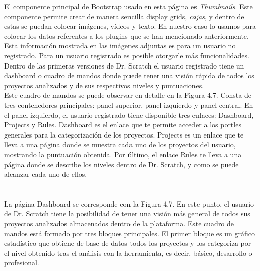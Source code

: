 \documentclass[a4paper, 12pt]{book}
\begin{document}
El componente principal de Bootstrap usado en esta página es \emph{Thumbnails}. Este
componente permite crear de manera sencilla display grids, \emph{cajas}, y dentro de
estas se puedan colocar imágenes, vídeos y texto. En nuestro caso lo usamos para
colocar los datos referentes a los plugins que se han mencionado anteriormente.  \\

Esta información mostrada en las imágenes adjuntas es para un usuario no registrado.
Para un usuario registrado es posible otorgarle más funcionalidades. Dentro de las
primeras versiones de Dr. Scratch el usuario registrado tiene un dashboard o cuadro
de mandos donde puede tener una visión rápida de todos los proyectos analizados y de
sus respectivos niveles y puntuaciones. \\

Este cuadro de mandos se puede observar en detalle en la Figura 4.7. Consta de tres 
contenedores principales: panel superior, panel izquierdo y panel central.
En el panel izquierdo, el usuario registrado tiene disponible tres enlaces: Dashboard,
Projects y Rules. Dashboard es el enlace que te permite acceder a los portles generales
para la categorización de los proyectos. Projects es un enlace que te lleva a una 
página donde se muestra cada uno de los proyectos del usuario, mostrando la puntuación
obtenida. Por último, el enlace Rules te lleva a una página donde se describe los niveles
dentro de Dr. Scratch, y como se puede alcanzar cada uno de ellos. \\ \\ \\

La página Dashboard se corresponde con la Figura 4.7. En este punto, el usuario de 
Dr. Scratch tiene la posibilidad de tener una visión más general de todos sus proyectos
analizados almacenados dentro de la plataforma. Este cuadro de mandos está formado por
tres bloques principales. El primer bloque es un gráfico estadístico que obtiene de 
base de datos todos los proyectos y los categoriza por el nivel obtenido tras el 
análisis con la herramienta, es decir, básico, desarrollo o profesional. \\ 
\end{document}
